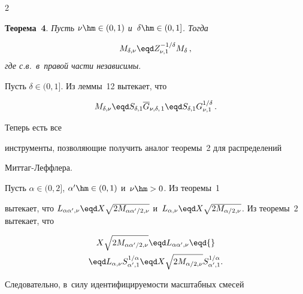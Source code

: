 \begin{multicols}{2}
\smallskip





\noindent


\textbf{Теорема~4}. \textit{Пусть $\nu\hm\in(0,1)$ и~$\delta\hm\in(0,1]$. Тогда}


$$


M_{\delta,\nu}\eqd Z_{\nu,1}^{-1/\delta} M_{\delta}\,,


$$ \textit{где с.в.\  в~правой части независимы}.





\smallskip





Пусть $\delta\in(0,1]$. Из леммы~12 вытекает, что


$$


M_{\delta,\nu}\eqd S_{\delta,1} \overline{G}_{\nu,\delta,\,1}\eqd


S_{\delta,1} G_{\nu,1}^{1/\delta}\,.


$$





 Теперь есть все


инструменты, позволяющие получить аналог теоремы~2 для распределений


Мит\-таг-Леф\-флера.





Пусть $\alpha\in(0,2]$, $\alpha'\hm\in(0,1)$ и~$\nu\hm>0$. Из тео\-ремы~1


вытекает, что $L_{\alpha\alpha',\nu}\eqd


X\sqrt{2M_{\alpha\alpha'/2,\nu}}$ и~$L_{\alpha,\nu}\eqd


X\sqrt{2M_{\alpha/2,\nu}}$. Из теоремы~2 вытекает, что


\begin{multline*}


X\sqrt{2M_{\alpha\alpha'/2,\nu}}\eqd


L_{\alpha\alpha',\nu}\eqd{}\\


{}\eqd L_{\alpha,\nu}


S_{\alpha',1}^{1/\alpha}\eqd X\sqrt{2M_{\alpha/2,\nu}}


S_{\alpha',1}^{1/\alpha}.


\end{multline*}


Следовательно, в~силу идентифицируемости масштабных смесей



\end{multicols}
